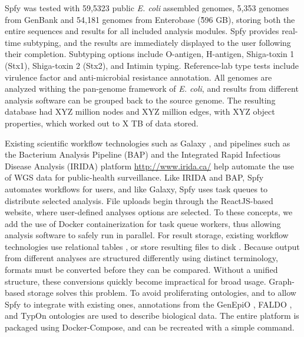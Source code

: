 \documentclass{article}
\begin{document}
Spfy was tested with 59,5323 public \textit{E. coli} assembled genomes, 5,353 genomes from GenBank and 54,181 genomes from Enterobase (\~596 GB), storing both the entire sequences and results for all included analysis modules.
Spfy provides real-time subtyping, and the results are immediately displayed to the user following their completion.
Subtyping options include O-antigen, H-antigen, Shiga-toxin 1 (Stx1), Shiga-toxin 2 (Stx2), and Intimin typing. Reference-lab type tests include virulence factor and anti-microbial resistance annotation. All genomes are analyzed withing the pan-genome framework of \textit{E. coli}, and results from different analysis software can be grouped back to the source genome.
The resulting database had XYZ million nodes and XYZ million edges, with XYZ object properties, which worked out to X TB of data stored. \para

Existing scientific workflow technologies such as Galaxy \cite{goecks2010galaxy}, and pipelines such as the Bacterium Analysis Pipeline (BAP) \cite{thomsen2016bacterial} and the Integrated Rapid Infectious Disease Analysis (IRIDA) platform \url{http://www.irida.ca/} help automate the use of WGS data for public-health surveillance.
Like IRIDA and BAP, Spfy automates workflows for users, and like Galaxy, Spfy uses task queues to distribute selected analysis. File uploads begin through the ReactJS-based website, where user-defined analyses options are selected. To these concepts, we add the use of Docker containerization for task queue workers, thus allowing analysis software to safely run in parallel.
For result storage, existing workflow technologies use relational tables \cite{goecks2010galaxy}, or store resulting files to disk \cite{thomsen2016bacterial}.
Because output from different analyses are structured differently using distinct terminology, formats must be converted before they can be compared. Without a unified structure, these conversions quickly become impractical for broad usage. Graph-based storage solves this problem.
To avoid proliferating ontologies, and to allow Spfy to integrate with existing ones, annotations from the GenEpiO \citep{griffiths2017context}, FALDO \citep{bolleman2016faldo}, and TypOn \citep{vaz2014typon} ontologies are used to describe biological data.
The entire platform is packaged using Docker-Compose, and can be recreated with a simple command. \para



\para
\end{document}
